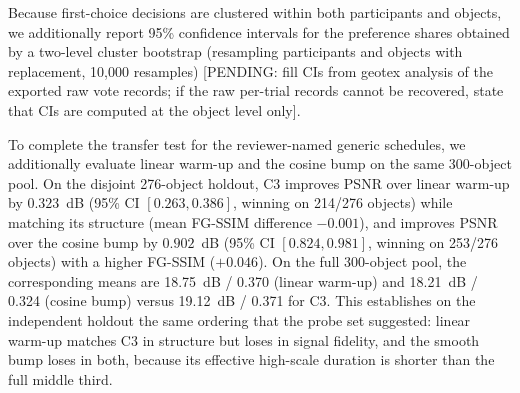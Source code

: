Because first-choice decisions are clustered within both participants and objects, we additionally report 95\% confidence intervals for the preference shares obtained by a two-level cluster bootstrap (resampling participants and objects with replacement, 10{,}000 resamples) [PENDING: fill CIs from geotex analysis of the exported raw vote records; if the raw per-trial records cannot be recovered, state that CIs are computed at the object level only].


To complete the transfer test for the reviewer-named generic schedules, we additionally evaluate linear warm-up and the cosine bump on the same 300-object pool. On the disjoint 276-object holdout, C3 improves PSNR over linear warm-up by $0.323$~dB (95\% CI $[0.263, 0.386]$, winning on 214/276 objects) while matching its structure (mean FG-SSIM difference $-0.001$), and improves PSNR over the cosine bump by $0.902$~dB (95\% CI $[0.824, 0.981]$, winning on 253/276 objects) with a higher FG-SSIM ($+0.046$). On the full 300-object pool, the corresponding means are 18.75~dB / 0.370 (linear warm-up) and 18.21~dB / 0.324 (cosine bump) versus 19.12~dB / 0.371 for C3. This establishes on the independent holdout the same ordering that the probe set suggested: linear warm-up matches C3 in structure but loses in signal fidelity, and the smooth bump loses in both, because its effective high-scale duration is shorter than the full middle third.
